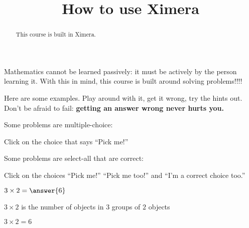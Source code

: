 \documentclass{ximera}
\title{How to use Ximera}
\begin{document}
\begin{abstract}
  This course is built in Ximera.
\end{abstract}\maketitle

Mathematics cannot be learned passively: it must be actively
by the person learning it.  With this in mind, this course is built
around solving problems!!!!

Here are some examples.  Play around with it, get it wrong, try the
hints out.  Don't be afraid to fail: \textbf{getting an answer wrong
  never hurts you.}


\begin{example}
  Some problems are multiple-choice:
  \begin{multipleChoice}
  \end{multipleChoice}
  \begin{hint}
    Click on the choice that says ``Pick me!''
  \end{hint}
\end{example}


\begin{example}
  Some problems are select-all that are correct:
  \begin{selectAll}
  \end{selectAll}
  \begin{hint}
    Click on the choices ``Pick me!'' ``Pick me too!'' and ``I'm a correct choice too.''
  \end{hint}
\end{example}


\begin{example}
  $3\times 2 = \answer{6}$   
  \begin{hint}
    $3 \times 2$ is the number of objects in $3$ groups of $2$ objects
  \end{hint}
  \begin{hint}
    \begin{image}
    \end{image}
  \end{hint}
  \begin{hint}
    $3\times 2=6$
  \end{hint}
\end{example}
\end{document}
